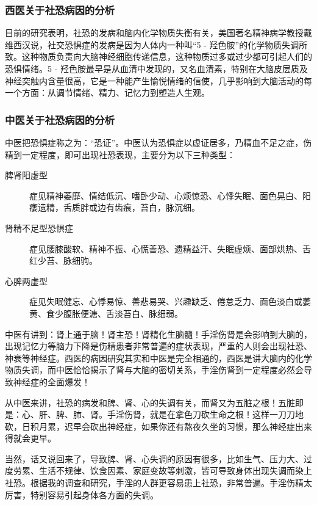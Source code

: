 \subsubsection{西医关于社恐病因的分析}

目前的研究表明，社恐的发病和脑内化学物质失衡有关，美国著名精神病学教授戴维西汉说，社交恐惧症的发病是因为人体内一种叫“5 - 羟色胺”的化学物质失调所致。这种物质负责向大脑神经细胞传递信息，这种物质过多或过少都可引起人们的恐惧情绪。5 - 羟色胺最早是从血清中发现的，又名血清素，特别在大脑皮层质及神经突触内含量很高，它是一种能产生愉悦情绪的信使，几乎影响到大脑活动的每一个方面：从调节情绪、精力、记忆力到塑造人生观。

\subsubsection{中医关于社恐病因的分析}

中医把恐惧症称之为：“恐证”。中医认为恐惧症以虚证居多，乃精血不足之症，伤精到一定程度，即可出现社恐表现，主要分为以下三种类型：

\begin{description}
    \item[脾肾阳虚型] 症见精神萎靡、情结低沉、嗜卧少动、心烦惊恐、心悸失眠、面色晃白、阳痿遗精，舌质胖或边有齿痕，苔白，脉沉细。
    \item[肾精不足型恐惧症] 症见腰膝酸软、精神不振、心慌善恐、遗精益汗、失眠虚烦、面部烘热、舌红少苔、脉细驹。
    \item[心脾两虚型] 症见失眠健忘、心悸易惊、善悲易哭、兴趣缺乏、倦怠乏力、面色淡白或萎黄、食少腹胀便溏、舌淡苔白、脉细弱。
\end{description}

中医有讲到：肾上通于脑！肾主恐！肾精化生脑髓！手淫伤肾是会影响到大脑的，出现记忆力等脑力下降是伤精患者非常普遍的症状表现，严重的人则会出现社恐、神衰等神经症。西医的病因研究其实和中医是完全相通的，西医是讲大脑内的化学物质失调，而中医恰恰揭示了肾与大脑的密切关系，手淫伤肾到一定程度必然会导致神经症的全面爆发！

从中医来讲，社恐的病发和脾、肾、心的失调有关，而肾又为五脏之根！五脏即是：心、肝、脾、肺、肾。手淫伤肾，就是在拿色刀砍生命之根！这样一刀刀地砍，日积月累，迟早会砍出神经症，如果你还有熬夜久坐的习惯，那么神经症出来得就会更早。

当然，话又说回来了，导致脾、肾、心失调的原因有很多，比如生气、压力大、过度劳累、生活不规律、饮食因素、家庭变故等刺激，皆可导致身体出现失调而染上社恐。根据我的调查和研究，手淫的人群更容易患上社恐，非常普遍。手淫伤精太厉害，特别容易引起身体各方面的失调。

